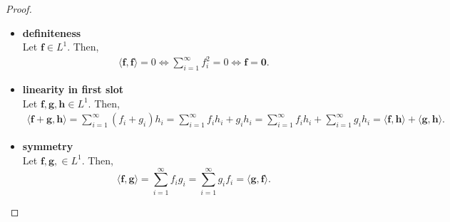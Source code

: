 \begin{proof}
\begin{itemize}
        \item \textbf{definiteness} \\ Let $\mathbf{f} \in L^1$.
            Then,
            \begin{align*}
                \langle \mathbf{f}, \mathbf{f} \rangle = 0
                \iff
                \sum\limits_{i=1}^{\infty} f_i^2 = 0
                \iff
                \mathbf{f} = \mathbf{0}.
            \end{align*}

        \item \textbf{linearity in first slot} \\
            Let $\mathbf{f}, \mathbf{g}, \mathbf{h} \in L^1$.
            Then,
            \begin{align*}
                \langle \mathbf{f} + \mathbf{g}, \mathbf{h} \rangle
                = \sum\limits_{i=1}^{\infty} (f_i + g_i)h_i
                = \sum\limits_{i=1}^{\infty} f_ih_i + g_ih_i
                = \sum\limits_{i=1}^{\infty} f_ih_i +\sum\limits_{i=1}^{\infty} g_ih_i
                = \langle \mathbf{f}, \mathbf{h} \rangle + \langle \mathbf{g}, \mathbf{h} \rangle.
            \end{align*}

        \item \textbf{symmetry} \\
            Let $\mathbf{f}, \mathbf{g}, \in L^1$.
            Then,
            \begin{equation*}
                \langle \mathbf{f}, \mathbf{g} \rangle
                = \sum\limits_{i=1}^{\infty} f_ig_i
                = \sum\limits_{i=1}^{\infty} g_if_i
                = \langle \mathbf{g}, \mathbf{f} \rangle.
            \end{equation*}
    \end{itemize}
\end{proof}

